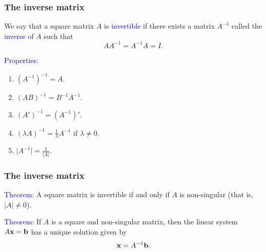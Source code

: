 \documentclass[11pt,aspectratio=169]{beamer}
\begin{document}
\begin{frame}
\frametitle{The inverse matrix}
\begin{small}
We say that a square matrix $A$ is \textcolor{blue}{invertible} if there exists a matrix $A^{-1}$ called the \textcolor{blue}{inverse} of $A$ such that
$$
A A^{-1}=A^{-1}A=I.
$$



\textcolor{blue}{Properties:}
\begin{enumerate}
\item $(A^{-1})^{-1}=A$.
\item $(A B)^{-1}=B^{-1}A^{-1}.$
\item $(A')^{-1}=(A^{-1})'.$
\item $(\lambda A)^{-1}=\frac{1}{\lambda} A^{-1}$ if $\lambda \neq 0$.
\item $\vert A^{-1} \vert=\frac{1}{\vert A \vert}$.

\end{enumerate}



\end{small}
\end{frame}

\begin{frame}
\frametitle{The inverse matrix}
\begin{small}


\textcolor{blue}{Theorem:} A square matrix is invertible if and only if $A$ is non-singular (that is, $\vert A \vert \neq 0$).

\vskip 12pt

\textcolor{blue}{Theorem:} If $A$ is a square and non-singular matrix, then the linear system
$A{\bf x}={\bf b}$ has a unique solution given by $${\bf x}=A^{-1}{\bf b}.$$
 



\end{small}
\end{frame}
\end{document}
